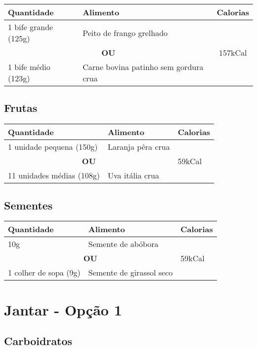 \begin{tabular}{p{8cm}p{8cm}c}
\toprule
\textbf{Quantidade} & \textbf{Alimento} & \textbf{Calorias} \\
\midrule
1 bife grande (125g) & Peito de frango grelhado & \multirow{4}{*}{157kCal} \\
\cmidrule(lr){1-2}
\multicolumn{2}{c}{\textbf{OU}} \\
\cmidrule(lr){1-2}
1 bife médio (123g) & Carne bovina patinho sem gordura crua & \\
\bottomrule
\end{tabular}

\subsection*{Frutas}

\begin{tabular}{p{8cm}p{8cm}p{1.5cm}}
\toprule
\textbf{Quantidade} & \textbf{Alimento} & \textbf{Calorias} \\
\midrule
1 unidade pequena (150g) & Laranja pêra crua & \multirow{4}{*}{59kCal} \\
\cmidrule(lr){1-2}
\multicolumn{2}{c}{\textbf{OU}} \\
\cmidrule(lr){1-2}
11 unidades médias (108g) & Uva itália crua \\
\bottomrule
\end{tabular}

\subsection*{Sementes}

\begin{tabular}{p{8cm}p{8cm}p{1.5cm}}
\toprule
\textbf{Quantidade} & \textbf{Alimento} & \textbf{Calorias} \\
\midrule
10g & Semente de abóbora & \multirow{4}{*}{59kCal} \\
\cmidrule(lr){1-2}
\multicolumn{2}{c}{\textbf{OU}} \\
\cmidrule(lr){1-2}
1 colher de sopa (9g) & Semente de girassol seco \\
\bottomrule
\end{tabular}

\section*{Jantar - Opção 1}

\subsection*{Carboidratos}

